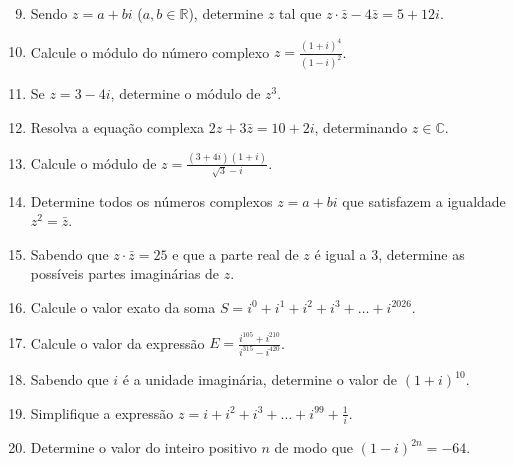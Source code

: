 \documentclass[12pt,a4paper]{article}
\begin{document}
\begin{enumerate}\setcounter{enumi}{8}
    \item Sendo $z = a + bi$ ($a, b \in \mathbb{R}$), determine $z$ tal que $z \cdot \bar{z} - 4\bar{z} = 5 + 12i$.

    \item Calcule o módulo do número complexo $z = \frac{(1 + i)^4}{(1 - i)^2}$.

    \item Se $z = 3 - 4i$, determine o módulo de $z^3$.

    \item Resolva a equação complexa $2z + 3\bar{z} = 10 + 2i$, determinando $z \in \mathbb{C}$.

    \item Calcule o módulo de $z = \frac{(3 + 4i)(1 + i)}{\sqrt{3} - i}$.

    \item Determine todos os números complexos $z = a + bi$ que satisfazem a igualdade $z^2 = \bar{z}$.

    \item Sabendo que $z \cdot \bar{z} = 25$ e que a parte real de $z$ é igual a $3$, determine as possíveis partes imaginárias de $z$.
\end{enumerate}


\begin{enumerate}\setcounter{enumi}{15}
    \item Calcule o valor exato da soma $S = i^0 + i^1 + i^2 + i^3 + \dots + i^{2026}$.

    \item Calcule o valor da expressão $E = \frac{i^{105} + i^{210}}{i^{315} - i^{420}}$.

    \item Sabendo que $i$ é a unidade imaginária, determine o valor de $(1 + i)^{10}$.

    \item Simplifique a expressão $z = i + i^2 + i^3 + \dots + i^{99} + \frac{1}{i}$.

    \item Determine o valor do inteiro positivo $n$ de modo que $(1 - i)^{2n} = -64$.
\end{enumerate}
\end{document}
